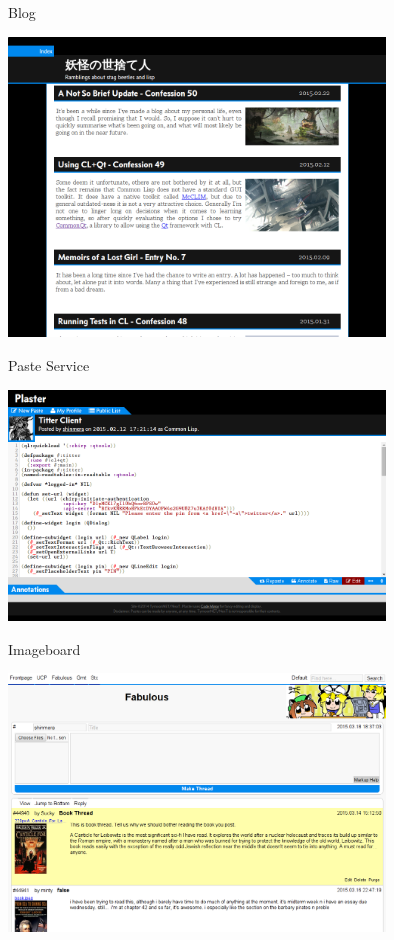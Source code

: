 \documentclass[12pt]{beamer}
\newcommand{\toptitle}[1]{
  {\huge #1} \\
  \vspace{0.2cm}
}
\begin{document}
\begin{frame}
  \toptitle{Blog}
  \begin{center}\includegraphics[width=10cm]{reader.png}\end{center}
\end{frame}

\begin{frame}
  \toptitle{Paste Service}
  \begin{center}\includegraphics[width=10cm]{plaster.png}\end{center}
\end{frame}

\begin{frame}
  \toptitle{Imageboard}
  \begin{center}\includegraphics[width=10cm]{purplish.png}\end{center}
\end{frame}
\end{document}
